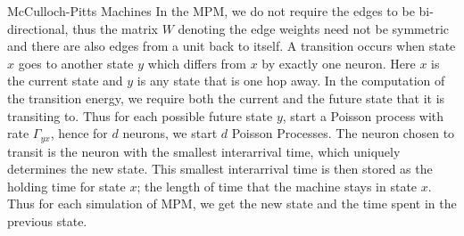 \documentclass[10pt,appendixnumberbeamer]{beamer}
\begin{document}
\begin{frame}{McCulloch-Pitts Machines}
{In the MPM, we do not require the edges to be bi-directional, thus the matrix $W$ denoting the edge weights need not be symmetric and there are also edges from a unit back to itself. A transition occurs when state $x$ goes to another state $y$ which differs from $x$ by exactly one neuron. Here $x$ is the current state and $y$ is any state that is one hop away. In the computation of the transition energy, we require both the current and the future state that it is transiting to. Thus for each possible future state $y$, start a Poisson process with rate $\Gamma_{yx}$, hence for $d$ neurons, we start $d$ Poisson Processes. The neuron chosen to transit is the neuron with the smallest interarrival time, which uniquely determines the new state. This smallest interarrival time is then stored as the holding time for state $x$; the length of time that the machine stays in state $x$. Thus for each simulation of MPM, we get the new state and the time spent in the previous state.
}

\end{frame}
\end{document}
